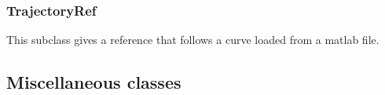 \subsubsection{TrajectoryRef}
This subclass gives a reference that follows a curve loaded from a matlab file.

\subsection{Miscellaneous classes} 	%




